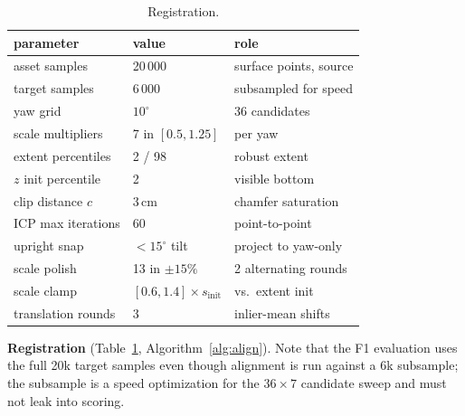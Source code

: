 \begin{table}[htbp]
\caption{Registration.}
\label{tab:s-align}
\centering\footnotesize\setlength{\tabcolsep}{4pt}
\begin{tabular}{@{}p{26mm}p{20mm}p{28mm}@{}}
\toprule
parameter & value & role \\
\midrule
asset samples & 20\,000 & surface points, source \\
target samples & 6\,000 & subsampled for speed \\
yaw grid & $10^\circ$ & 36 candidates \\
scale multipliers & 7 in $[0.5,1.25]$ & per yaw \\
extent percentiles & 2 / 98 & robust extent \\
$z$ init percentile & 2 & visible bottom \\
clip distance $c$ & 3\,cm & chamfer saturation \\
ICP max iterations & 60 & point-to-point \\
upright snap & $<15^\circ$ tilt & project to yaw-only \\
scale polish & 13 in $\pm15\%$ & 2 alternating rounds \\
scale clamp & $[0.6,1.4]\times s_{\text{init}}$ & vs.\ extent init \\
translation rounds & 3 & inlier-mean shifts \\
\bottomrule
\end{tabular}
\end{table}

\textbf{Registration} (Table~\ref{tab:s-align}, Algorithm~\ref{alg:align}).
Note that the F1 evaluation uses the full 20k target samples even though
alignment is run against a 6k subsample; the subsample is a speed
optimization for the $36\times7$ candidate sweep and must not leak into
scoring.

